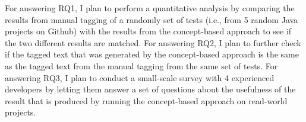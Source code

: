 For answering RQ1, I plan to perform a quantitative analysis by comparing the results from manual tagging of a randomly set of tests (i.e., from 5 random Java projects on Github) with the results from the concept-based approach to see if the two different results are matched.
%
For answering RQ2, I plan to further check if the tagged text that was generated by the concept-based approach is the same as the tagged text from the manual tagging from the same set of tests.
%
For answering RQ3, I plan to conduct a small-scale survey with 4 experienced developers by letting them answer a set of questions about the usefulness of the result that is produced by running the concept-based approach on read-world projects.



